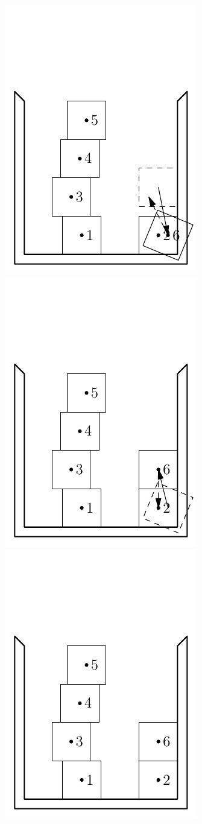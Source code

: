 \documentclass[12pt, sumlimits, intlimits]{article}
\begin{document}
\begin{figure}
\includegraphics[width=\w]{dem-9}%
\includegraphics[width=\w]{dem-10}%
\includegraphics[width=\w]{dem-11}

\end{figure}
\end{document}
